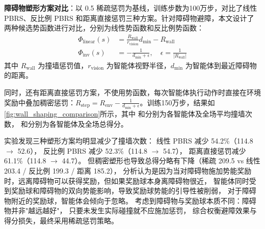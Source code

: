 \documentclass[12pt, a4paper, UTF8]{ctexart}
\numberwithin{equation}{section}
\begin{document}
\textbf{障碍物塑形方案对比}：以 0.5 稀疏惩罚为基线，训练步数为100万步，对比了线性 PBRS、反比例 PBRS 和距离直接惩罚三种方案。针对障碍物避障，本文设计了两种候选势函数进行对比，分别为线性势函数和反比例势函数：
\begin{align}
  \Phi_{\text{linear}}(s) &= \frac{R_{\text{wall}}}{r_{\text{vision}}} d_{\min} - R_{\text{wall}} \label{eq:wall_linear} \\
  \Phi_{\text{inv}}(s) &= -\frac{1}{d_{\min} + \epsilon}, \quad \epsilon = \frac{1}{|R_{\text{wall}}|} \label{eq:wall_inverse}
\end{align}
其中 $R_{\text{wall}}$ 为撞墙惩罚值，$r_{\text{vision}}$ 为智能体视野半径，$d_{\min}$ 为智能体到最近障碍物的距离。

同时，还有距离直接惩罚方案，不使用势函数，每次智能体执行动作时直接在环境奖励中叠加稠密惩罚：$R_{\text{step}} = R_{\text{env}}-\frac{1}{d_{\min}+\epsilon}$。训练150万步，结果如
\autoref{fig:wall_shaping_comparison}所示，其中
和分别为各智能体及全场平均撞墙次数，
和分别为各智能体及全场总得分。

实验发现三种塑形方案均明显减少了撞墙次数：
线性 PBRS 减少 54.2\%（114.8 $\rightarrow$ 52.6），
反比例 PBRS 减少 52.3\%（114.8 $\rightarrow$ 54.7），
距离直接惩罚减少 61.1\%（114.8 $\rightarrow$ 44.7）。
但稠密塑形也导致总得分略有下降（稀疏 209.5 vs 线性 203.4 / 反比例 199.3 / 距离 185.2），
分析认为是因为当对障碍物施加势能奖励时，远离障碍物可以获得奖励，但如果奖励球本身离障碍物很近，
智能体同时受到奖励球和障碍物的双向势能影响，导致奖励球势能的引导性被削弱，
对于障碍物附近的奖励球，智能体会倾向于忽略。
考虑到障碍物与奖励球本质不同：障碍物并非"越远越好"，
只要未发生实际碰撞就不应施加惩罚，
综合权衡避障效果与得分损失，最终采用稀疏惩罚策略。
\end{document}
